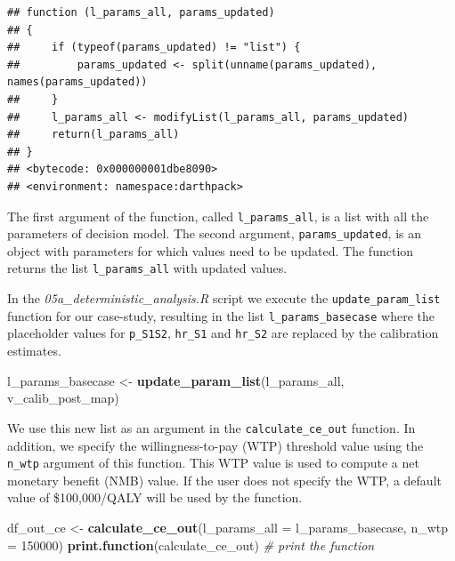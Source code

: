 \documentclass[]{book}
\newenvironment{Shaded}{\begin{snugshade}}{\end{snugshade}}
\newcommand{\CommentTok}[1]{\textcolor[rgb]{0.56,0.35,0.01}{\textit{#1}}}
\newcommand{\DataTypeTok}[1]{\textcolor[rgb]{0.13,0.29,0.53}{#1}}
\newcommand{\DecValTok}[1]{\textcolor[rgb]{0.00,0.00,0.81}{#1}}
\newcommand{\KeywordTok}[1]{\textcolor[rgb]{0.13,0.29,0.53}{\textbf{#1}}}
\newcommand{\NormalTok}[1]{#1}
\newcommand{\StringTok}[1]{\textcolor[rgb]{0.31,0.60,0.02}{#1}}
\begin{document}
\begin{verbatim}
## function (l_params_all, params_updated) 
## {
##     if (typeof(params_updated) != "list") {
##         params_updated <- split(unname(params_updated), names(params_updated))
##     }
##     l_params_all <- modifyList(l_params_all, params_updated)
##     return(l_params_all)
## }
## <bytecode: 0x000000001dbe8090>
## <environment: namespace:darthpack>
\end{verbatim}

The first argument of the function, called \texttt{l\_params\_all}, is a list with all the parameters of decision model. The second argument, \texttt{params\_updated}, is an object with parameters for which values need to be updated. The function returns the list \texttt{l\_params\_all} with updated values.

In the \emph{05a\_deterministic\_analysis.R} script we execute the \texttt{update\_param\_list} function for our case-study, resulting in the list \texttt{l\_params\_basecase} where the placeholder values for \texttt{p\_S1S2}, \texttt{hr\_S1} and \texttt{hr\_S2} are replaced by the calibration estimates.

\begin{Shaded}
\begin{Highlighting}[]
\NormalTok{l_params_basecase <-}\StringTok{ }\KeywordTok{update_param_list}\NormalTok{(l_params_all, v_calib_post_map) }
\end{Highlighting}
\end{Shaded}

We use this new list as an argument in the \texttt{calculate\_ce\_out} function. In addition, we specify the willingness-to-pay (WTP) threshold value using the \texttt{n\_wtp} argument of this function. This WTP value is used to compute a net monetary benefit (NMB) value. If the user does not specify the WTP, a default value of \$100,000/QALY will be used by the function.

\begin{Shaded}
\begin{Highlighting}[]
\NormalTok{df_out_ce <-}\StringTok{ }\KeywordTok{calculate_ce_out}\NormalTok{(}\DataTypeTok{l_params_all =}\NormalTok{ l_params_basecase, }
                                \DataTypeTok{n_wtp =} \DecValTok{150000}\NormalTok{)}
\KeywordTok{print.function}\NormalTok{(calculate_ce_out) }\CommentTok{# print the function}
\end{Highlighting}
\end{Shaded}
\end{document}
